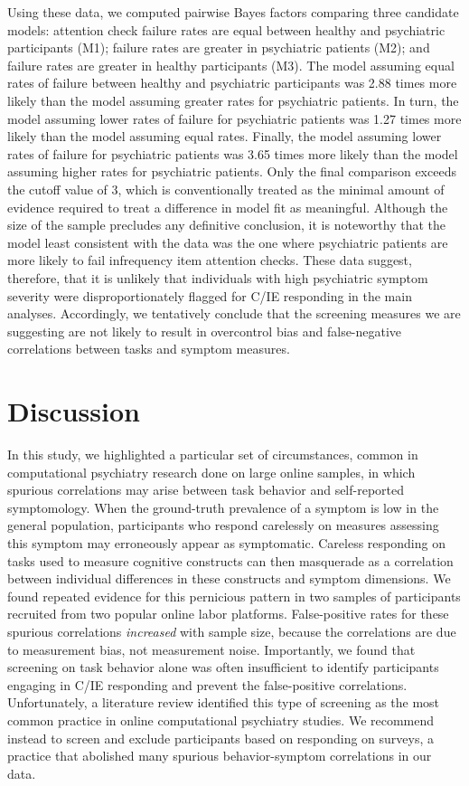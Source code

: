 \documentclass[a4paper,notitlepage,12pt]{article}
\begin{document}
Using these data, we computed pairwise Bayes factors comparing three candidate models: attention check failure rates are equal between healthy and psychiatric participants (M1); failure rates are greater in psychiatric patients (M2); and failure rates are greater in healthy participants (M3). The model assuming equal rates of failure between healthy and psychiatric participants was 2.88 times more likely than the model assuming greater rates for psychiatric patients. In turn, the model assuming lower rates of failure for psychiatric patients was 1.27 times more likely than the model assuming equal rates. Finally, the model assuming lower rates of failure for psychiatric patients was 3.65 times more likely than the model assuming higher rates for psychiatric patients. Only the final comparison exceeds the cutoff value of 3, which is conventionally treated as the minimal amount of evidence required to treat a difference in model fit as meaningful. Although the size of the sample precludes any definitive conclusion, it is noteworthy that the model least consistent with the data was the one where psychiatric patients are more likely to fail infrequency item attention checks. These data suggest, therefore, that it is unlikely that individuals with high psychiatric symptom severity were disproportionately flagged for C/IE responding in the main analyses. Accordingly, we tentatively conclude that the screening measures we are suggesting are not likely to result in overcontrol bias and false-negative correlations between tasks and symptom measures.

\section*{Discussion}

In this study, we highlighted a particular set of circumstances, common in computational psychiatry research done on large online samples, in which spurious correlations may arise between task behavior and self-reported symptomology. When the ground-truth prevalence of a symptom is low in the general population, participants who respond carelessly on measures assessing this symptom may erroneously appear as symptomatic. Careless responding on tasks used to measure cognitive constructs can then masquerade as a correlation between individual differences in these constructs and symptom dimensions. We found repeated evidence for this pernicious pattern in two samples of participants recruited from two popular online labor platforms. False-positive rates for these spurious correlations \emph{increased} with sample size, because the correlations are due to measurement bias, not measurement noise. Importantly, we found that screening on task behavior alone was often insufficient to identify participants engaging in C/IE responding and prevent the false-positive correlations. Unfortunately, a literature review identified this type of screening as the most common practice in online computational psychiatry studies. We recommend instead to screen and exclude participants based on responding on surveys, a practice that abolished many spurious behavior-symptom correlations in our data. 
\end{document}

